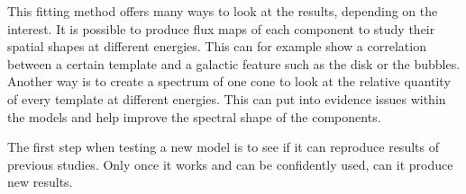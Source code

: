 This fitting method offers many ways to look at the results, depending on the interest. It is possible to produce flux maps of each component to study their spatial shapes at different energies. This can for example show a correlation between a certain template and a galactic feature such as the disk or the bubbles. Another way is to create a spectrum of one cone to look at the relative quantity of every template at different energies. This can put into evidence issues within the models and help improve the spectral shape of the components.

The first step when testing a new model is to see if it can reproduce results of previous studies. Only once it works and can be confidently used, can it produce new results.




